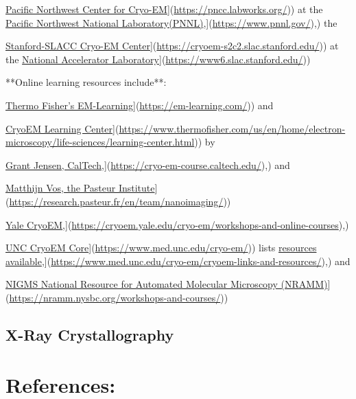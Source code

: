 \documentclass[
]{book}
\begin{document}
\href{\%5Bhttps://pncc.labworks.org/}{Pacific Northwest Center for Cryo-EM}{]}(\url{https://pncc.labworks.org/})) at the \href{\%5Bhttps://www.pnnl.gov/}{Pacific Northwest National Laboratory(PNNL)},{]}(\url{https://www.pnnl.gov/}),) the

\href{\%5Bhttps://cryoem-s2c2.slac.stanford.edu/}{Stanford-SLACC Cryo-EM Center}{]}(\url{https://cryoem-s2c2.slac.stanford.edu/})) at the \href{\%5Bhttps://www6.slac.stanford.edu/}{National Accelerator Laboratory}{]}(\url{https://www6.slac.stanford.edu/}))

**Online learning resources include**:

\href{\%5Bhttps://em-learning.com/}{Thermo Fisher's EM-Learning}{]}(\url{https://em-learning.com/})) and

\href{\%5Bhttps://www.thermofisher.com/us/en/home/electron-microscopy/life-sciences/learning-center.html}{CryoEM Learning Center}{]}(\url{https://www.thermofisher.com/us/en/home/electron-microscopy/life-sciences/learning-center.html})) by

\href{\%5Bhttps://cryo-em-course.caltech.edu/}{Grant Jensen, CalTech},{]}(\url{https://cryo-em-course.caltech.edu/}),) and

\href{\%5Bhttps://research.pasteur.fr/en/team/nanoimaging/}{Matthijn Vos, the Pasteur Institute}{]}(\url{https://research.pasteur.fr/en/team/nanoimaging/}))

\href{\%5Bhttps://cryoem.yale.edu/cryo-em/workshops-and-online-courses}{Yale CryoEM},{]}(\url{https://cryoem.yale.edu/cryo-em/workshops-and-online-courses}),)

\href{\%5Bhttps://www.med.unc.edu/cryo-em/}{UNC CryoEM Core}{]}(\url{https://www.med.unc.edu/cryo-em/})) lists \href{\%5Bhttps://www.med.unc.edu/cryo-em/cryoem-links-and-resources/}{resources available},{]}(\url{https://www.med.unc.edu/cryo-em/cryoem-links-and-resources/}),) and

\href{\%5Bhttps://nramm.nysbc.org/workshops-and-courses/}{NIGMS National Resource for Automated Molecular Microscopy (NRAMM)}{]}(\url{https://nramm.nysbc.org/workshops-and-courses/}))

\section{X-Ray Crystallography}\label{x-ray-crystallography}

\chapter{References:}\label{references}
\end{document}
